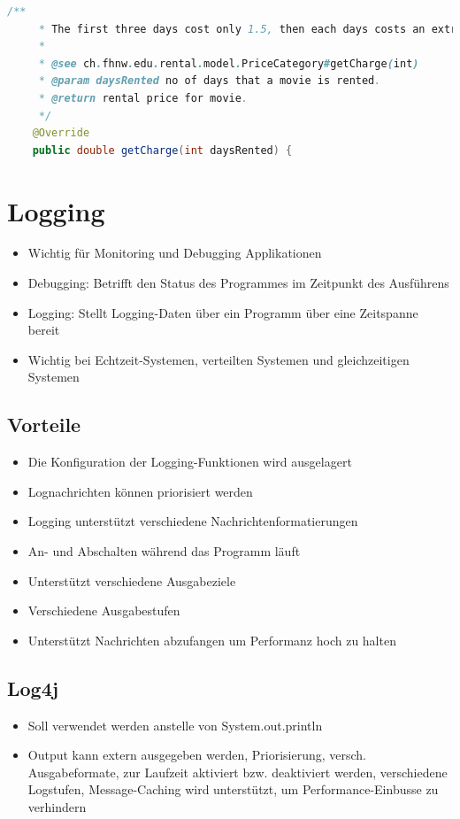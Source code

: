 \documentclass[a4paper,10pt]{article}
\begin{document}
\begin{lstlisting}[language=Java,caption=JavaDoc Beispiel 3, style=MyJavaStyle]
    /**
     * The first three days cost only 1.5, then each days costs an extra 1.5.
     * 
     * @see ch.fhnw.edu.rental.model.PriceCategory#getCharge(int)
     * @param daysRented no of days that a movie is rented.
     * @return rental price for movie.
     */
    @Override
    public double getCharge(int daysRented) {
\end{lstlisting}

\pagebreak
\section{Logging}
\begin{itemize}
	\item Wichtig für Monitoring und Debugging Applikationen
\item Debugging: Betrifft den Status des Programmes im Zeitpunkt des Ausführens
\item Logging: Stellt Logging-Daten über ein Programm über eine Zeitspanne bereit
\item Wichtig bei Echtzeit-Systemen, verteilten Systemen und gleichzeitigen Systemen
\end{itemize}

\subsection{Vorteile}
\begin{itemize}
	\item Die Konfiguration der Logging-Funktionen wird ausgelagert
	\item Lognachrichten können priorisiert werden
	\item Logging unterstützt verschiedene Nachrichtenformatierungen
	\item An- und Abschalten während das Programm läuft
	\item Unterstützt verschiedene Ausgabeziele
	\item Verschiedene Ausgabestufen
	\item Unterstützt Nachrichten abzufangen um Performanz hoch zu halten
\end{itemize}

\subsection{Log4j}
\begin{itemize}
\item Soll verwendet werden anstelle von System.out.println
\item Output kann extern ausgegeben werden, Priorisierung, versch. Ausgabeformate, zur Laufzeit aktiviert bzw. deaktiviert werden, verschiedene Logstufen, Message-Caching wird unterstützt, um Performance-Einbusse zu verhindern
\end{itemize}
\end{document}

